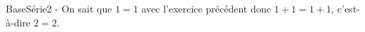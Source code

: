     BaseSérie2 - On sait que $1=1$ avec l’exercice précédent donc $1+1=1+1$,
    c’est-à-dire $2=2$.
